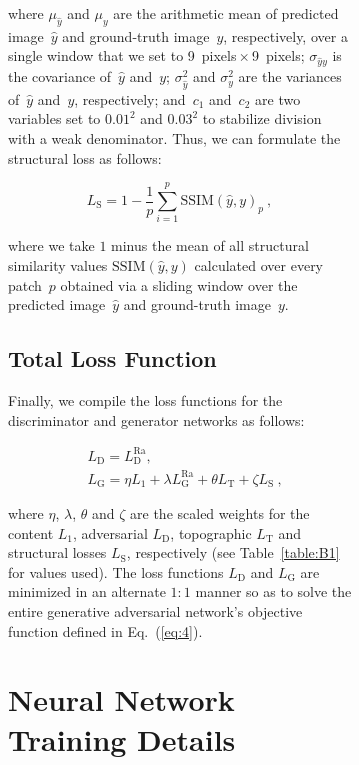 \documentclass[tc, noline]{copernicus}
\begin{document}
\begin{figure}[t]
\begin{figure}[t]
where $\mu_{\hat{y}}$ and $\mu_y$ are the arithmetic mean of predicted image~${\hat{y}}$ and ground-truth image~$y$, respectively, over a single window that we set to 9~pixels\,$\times$\,9~pixels; $\sigma_{{\hat{y}}y}$ is the covariance of~${\hat{y}}$ and~$y$; $\sigma_{\hat{y}}^2$ and $\sigma_y^2$ are the variances of~${\hat{y}}$ and~$y$, respectively; and~$c_1$ and~$c_2$ are two variables set to $0.01^2$ and $0.03^2$ to stabilize division with a weak denominator.
Thus, we can formulate the structural loss as follows:

\begin{equation}\label{eq:A7}
  L_{\mathrm{S}} = 1 - \dfrac{1}{p} \sum\limits_{i=1}^p \text{SSIM} (\hat{y}, y)_p~,
\end{equation}

where we take $1$ minus the mean of all structural similarity values $\text{SSIM}(\hat{y}, y)$ calculated over every patch~$p$ obtained via a sliding window over the predicted image~${\hat{y}}$ and ground-truth image~$y$.

\subsection{Total Loss Function}

Finally, we compile the loss functions for the discriminator and generator networks as follows:

\begin{align}
  & L_{\mathrm{D}} = L_{\mathrm{D}}^{\text{Ra}}, \label{eq:A8}\\
  & L_{\mathrm{G}} = \eta L_1 + \lambda L_{\mathrm{G}}^{\text{Ra}} + \theta L_{\mathrm{T}} + \zeta L_{\mathrm{S}}~, \label{eq:A9}
\end{align}

where $\eta$, $\lambda$, $\theta$ and $\zeta$ are the scaled weights for the content $L_1$, adversarial $L_{\mathrm{D}}$, topographic $L_{\mathrm{T}}$ and structural losses $L_{\mathrm{S}}$, respectively (see Table~\ref{table:B1} for values used).
The loss functions $L_{\mathrm{D}}$ and $L_{\mathrm{G}}$ are minimized in an alternate $1:1$ manner so as to solve the entire generative adversarial network's objective function defined in Eq.~(\ref{eq:4}).


\section{Neural Network Training Details} \label{appendix:B}


\end{figure}
\end{figure}
\end{document}

